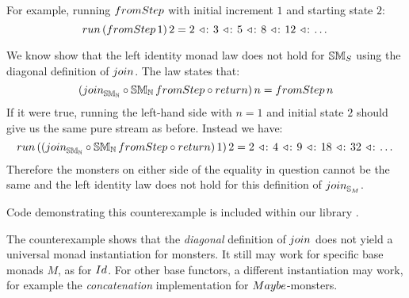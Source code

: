 For example, running $\fromstepstr$ with initial increment $1$ and starting state $2$:
$$
\strun\,(\fromstepstr\, 1)\, 2 = 2\, \acons\, 3\, \acons\, 5\, \acons\, 8\, \acons\, 12\, \acons\, \dots
$$

We know show that the left identity monad law does not hold for $\mathbb{SM}_{S}$ using the diagonal definition of $\join$.
The law states that:
$$
(\join_{\stmon{\nat}} \comp \stmon{\nat}\, \fromstepstr \comp \return)\, n = \fromstepstr\, n
$$
If it were true, running the left-hand side with $n = 1$ and initial state $2$ should give us the same pure stream as before.
Instead we have:
$$
\strun\, ((\join_{\stmon{\nat}} \comp \stmon{\nat}\, \fromstepstr \comp \return)\, 1)\, 2 = 2\, \acons\, 4\, \acons\, 9\, \acons\, 18\, \acons\, 32\, \acons\, \dots
$$
Therefore the monsters on either side of the equality in question cannot be the same and the left identity law does not hold for this definition of $\join_{\stream{M}}$.

Code demonstrating this counterexample is included within our library . 

The counterexample shows that the {\em diagonal} definition of $\join$ does not yield a universal monad instantiation for monsters. 
It still may work for specific base monads $M$, as for $\Id$.
For other base functors, a different instantiation may work, for example the {\em concatenation} implementation for $\maybe$-monsters.
